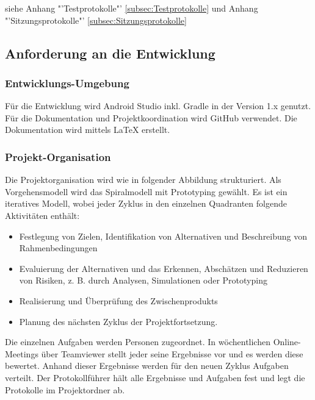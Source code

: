 siehe Anhang "'Testprotokolle"' \ref{subsec:Testprotokolle}
und Anhang "'Sitzungsprotokolle"' \ref{subsec:Sitzungsprotokolle}



\subsection{\textbf{Anforderung an die Entwicklung}}

\subsubsection{Entwicklungs-Umgebung}
Für die Entwicklung wird Android Studio inkl. Gradle in der Version 1.x genutzt. Für die Dokumentation und Projektkoordination wird GitHub verwendet.
Die Dokumentation wird mittels \LaTeX{} erstellt.



\subsubsection{Projekt-Organisation}
Die Projektorganisation wird wie in folgender Abbildung strukturiert. Als Vorgehensmodell wird das Spiralmodell mit Prototyping gewählt. Es ist ein iteratives Modell, wobei jeder Zyklus in den einzelnen Quadranten folgende Aktivitäten enthält:

\begin{itemize}
	\item Festlegung von Zielen, Identifikation von Alternativen und Beschreibung von Rahmenbedingungen
	\item Evaluierung der Alternativen und das Erkennen, Abschätzen und Reduzieren von Risiken, z. B. durch Analysen, Simulationen oder Prototyping
	\item Realisierung und Überprüfung des Zwischenprodukts
	\item Planung des nächsten Zyklus der Projektfortsetzung.
\end{itemize}

Die einzelnen Aufgaben werden Personen zugeordnet. In wöchentlichen Online-Meetings über Teamviewer stellt jeder seine Ergebnisse vor und es werden diese bewertet. Anhand dieser Ergebnisse werden für den neuen Zyklus Aufgaben verteilt. Der Protokollführer hält alle Ergebnisse und Aufgaben fest und legt die Protokolle im Projektordner ab.





